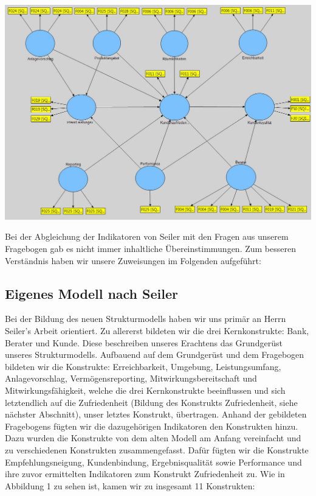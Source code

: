\documentclass{article}\usepackage[]{graphicx}\usepackage[]{color}
\begin{document}
\hspace*{-4.8cm}\includegraphics[scale = 0.882]{figure/zweitesmodell}


Bei der Abgleichung der Indikatoren von Seiler mit den Fragen aus unserem Fragebogen gab es nicht immer inhaltliche Übereinstimmungen. Zum besseren Verständnis haben wir unsere Zuweisungen im Folgenden aufgeführt:



\subsection{Eigenes Modell nach Seiler}
Bei der Bildung des neuen Strukturmodells haben wir uns primär an Herrn Seiler's Arbeit orientiert. Zu allererst bildeten wir die drei Kernkonstrukte: Bank, Berater und Kunde. Diese beschreiben unseres Erachtens das Grundgerüst unseres Strukturmodells. Aufbauend auf dem Grundgerüst und dem Fragebogen bildeten wir die Konstrukte: Erreichbarkeit, Umgebung, Leistungsumfang, Anlagevorschlag, Vermögensreporting, Mitwirkungsbereitschaft und Mitwirkungsfähigkeit, welche die drei Kernkonstrukte beeinflussen und sich letztendlich auf die Zufriedenheit (Bildung des Konstrukts Zufriedenheit, siehe nächster Abschnitt), unser letztes Konstrukt, übertragen. Anhand der gebildeten Fragebogens fügten wir die dazugehörigen Indikatoren den Konstrukten hinzu.
Dazu wurden die Konstrukte von dem alten Modell am Anfang vereinfacht und zu verschiedenen Konstrukten zusammengefasst. Dafür fügten wir die Konstrukte Empfehlungsneigung, Kundenbindung, Ergebnisqualität sowie Performance und ihre zuvor ermittelten Indikatoren zum Konstrukt Zufriedenheit zu. Wie in Abbildung 1 zu sehen ist, kamen wir zu insgesamt 11 Konstrukten:\\
\end{document}
